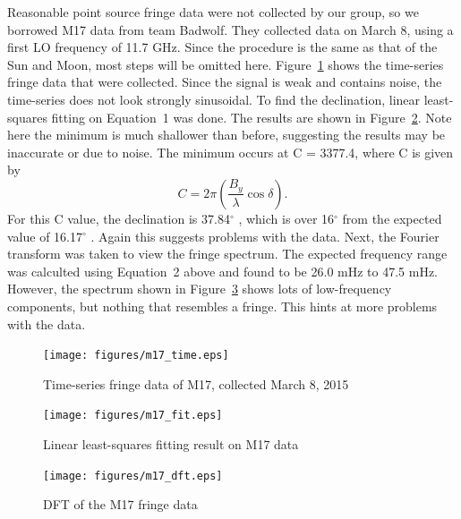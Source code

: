 \documentclass[12pt]{article}
\newcommand{\degree}{\ensuremath{^\circ} }
\begin{document}
Reasonable point source fringe data were not collected by our group, so we borrowed M17 data from team Badwolf.
They collected data on March 8, using a first LO frequency of 11.7 GHz.
Since the procedure is the same as that of the Sun and Moon, most steps will be omitted here.
Figure~\ref{fig:m17_time} shows the time-series fringe data that were collected.
Since the signal is weak and contains noise, the time-series does not look strongly sinusoidal.
To find the declination, linear least-squares fitting on Equation~1 was done.
The results are shown in Figure~\ref{fig:m17_fit}.
Note here the minimum is much shallower than before, suggesting the results may be inaccurate or due to noise.
The minimum occurs at C = 3377.4, where C is given by
\begin{equation}
C = 2 \pi \left( \frac{B_y}{\lambda} \cos \delta \right).
\end{equation}
For this C value, the declination is 37.84\degree, which is over 16\degree from the expected value of 16.17\degree.
Again this suggests problems with the data.
Next, the Fourier transform was taken to view the fringe spectrum.
The expected frequency range was calculted using Equation~2 above and found to be 26.0 mHz to 47.5 mHz.
However, the spectrum shown in Figure~\ref{fig:m17_dft} shows lots of low-frequency components, but nothing that resembles a fringe.
This hints at more problems with the data.


\begin{figure}
\centering
\texttt{[image: figures/m17\_time.eps]}
\caption{Time-series fringe data of M17, collected March 8, 2015}
\label{fig:m17_time}
\end{figure}

\begin{figure}
\centering
\texttt{[image: figures/m17\_fit.eps]}
\caption{Linear least-squares fitting result on M17 data}
\label{fig:m17_fit}
\end{figure}

\begin{figure}
\centering
\texttt{[image: figures/m17\_dft.eps]}
\caption{DFT of the M17 fringe data}
\label{fig:m17_dft}
\end{figure}


%

\enddocument
\end{document}
